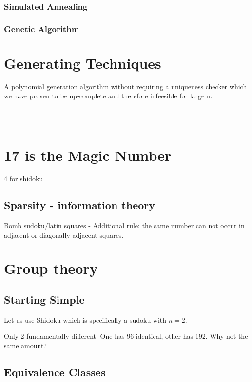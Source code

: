 \documentclass[a4paper,12pt]{article}
\begin{document}
		\subsubsection{Simulated Annealing} 
		\subsubsection{Genetic Algorithm}
\section{Generating  Techniques}

	A polynomial generation algorithm without requiring a uniqueness checker which we have proven to be np-complete and therefore infeesible for large n.

~~~~~~~~~~~~~~~~~~~~~~~~~~~~~~~~~~~~~~~~~~~~~~~~~~~~~~~~~~~~~~~~~~~~~~~~~~~~~~ %
\section{17 is the Magic Number}

	4 for shidoku
	\subsection{Sparsity - information theory}
		Bomb sudoku/latin squares - Additional rule: the same number can not occur in adjacent or diagonally adjacent squares.
		
\section{Group theory}
	\subsection{Starting Simple}
		Let us use Shidoku which is specifically a sudoku with $n=2$.

		Only 2 fundamentally different.
		One has 96 identical, other has 192. Why not the same amount?
		
	\subsection{Equivalence Classes}
	
\end{document}
